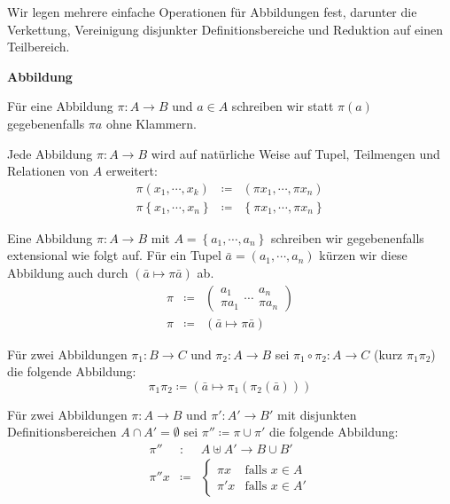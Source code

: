 Wir legen mehrere einfache Operationen für Abbildungen fest, darunter
die Verkettung, Vereinigung disjunkter Definitionsbereiche und Reduktion
auf einen Teilbereich.
\begin{defn}
\textbf{Abbildung}

Für eine Abbildung $\pi:A\rightarrow B$ und $a\in A$ schreiben wir
statt $\pi\left(a\right)$ gegebenenfalls $\pi a$ ohne Klammern.

Jede Abbildung $\pi:A\rightarrow B$ wird auf natürliche Weise auf
Tupel, Teilmengen und Relationen von $A$ erweitert:
\begin{eqnarray*}
\pi\left(x_{1},\cdots,x_{k}\right) & \coloneqq & \left(\pi x_{1},\cdots,\pi x_{n}\right)\\
\pi\left\{ x_{1},\cdots,x_{n}\right\}  & \coloneqq & \left\{ \pi x_{1},\cdots,\pi x_{n}\right\} 
\end{eqnarray*}

Eine Abbildung $\pi:A\rightarrow B$ mit $A=\left\{ a_{1},\cdots,a_{n}\right\} $
schreiben wir gegebenenfalls extensional wie folgt auf. Für ein Tupel
$\bar{a}=\left(a_{1},\cdots,a_{n}\right)$ kürzen wir diese Abbildung
auch durch $\left(\bar{a}\mapsto\pi\bar{a}\right)$ ab. 
\begin{eqnarray*}
\pi & \coloneqq & \left(\begin{array}{c}
a_{1}\\
\pi a_{1}
\end{array}\cdots\begin{array}{c}
a_{n}\\
\pi a_{n}
\end{array}\right)\\
\pi & \coloneqq & \left(\bar{a}\mapsto\pi\bar{a}\right)
\end{eqnarray*}

Für zwei Abbildungen $\pi_{1}:B\rightarrow C$ und $\pi_{2}:A\rightarrow B$
sei $\pi_{1}\circ\pi_{2}:A\rightarrow C$ (kurz $\pi_{1}\pi_{2}$)
die folgende Abbildung: 
\[
\pi_{1}\pi_{2}\coloneqq\left(\bar{a}\mapsto\pi_{1}\left(\pi_{2}\left(\bar{a}\right)\right)\right)
\]

Für zwei Abbildungen $\pi:A\rightarrow B$ und $\pi':A'\rightarrow B'$
mit disjunkten Definitionsbereichen $A\cap A'=\emptyset$ sei $\pi''\coloneqq\pi\cup\pi'$
die folgende Abbildung: 
\begin{eqnarray*}
\pi'' & : & A\uplus A'\rightarrow B\cup B'\\
\pi''x & \coloneqq & \begin{cases}
\pi x & \mathrm{falls}\,\,x\in A\\
\pi'x & \mathrm{falls}\,\,x\in A'
\end{cases}
\end{eqnarray*}


\end{defn}
